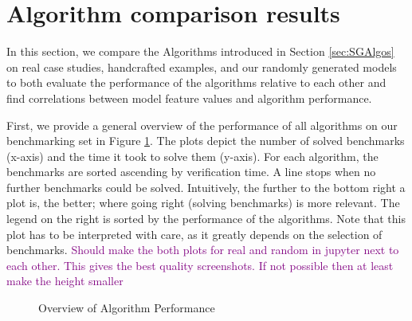 \section{Algorithm comparison results}

In this section, we compare the Algorithms introduced in Section \ref{sec:SGAlgos} on real case studies, handcrafted examples, and our randomly generated models to both evaluate the 
performance of the algorithms relative to each other and find correlations between model feature values and algorithm performance.

First, we provide a general overview of the performance of all algorithms on our benchmarking set in Figure \ref{fig:AlgoPerformance}.
The plots depict the number of solved benchmarks (x-axis) and the time it took to solve them (y-axis). 
For each algorithm, the benchmarks are sorted ascending by verification time. A line stops when no further benchmarks could be solved.
Intuitively, the further to the bottom right a plot is, the better; where going right (solving benchmarks) is more relevant.
The legend on the right is sorted by the performance of the algorithms.
Note that this plot has to be interpreted with care, as it greatly depends on the selection of benchmarks.
\textcolor{purple}{Should make the both plots for real and random in jupyter next to each other. This gives the best quality screenshots. If not possible then at least make the height smaller}
\begin{figure}
    \centering
    \qquad
    \caption[Overview of Algorithm Performance]{Overview of Algorithm Performance}%
    \label{fig:AlgoPerformance}
\end{figure}

